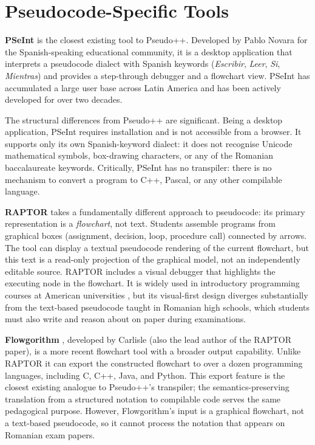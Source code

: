 \section{Pseudocode-Specific Tools}
\label{sec:pseudocode-tools}

\textbf{PSeInt} \cite{psint} is the closest existing tool to Pseudo++.
Developed by Pablo Novara for the Spanish-speaking educational community,
it is a desktop application that interprets a pseudocode dialect with
Spanish keywords (\textit{Escribir}, \textit{Leer}, \textit{Si},
\textit{Mientras}) and provides a step-through debugger and a flowchart
view.  PSeInt has accumulated a large user base across Latin America and
has been actively developed for over two decades.

The structural differences from Pseudo++ are significant.  Being a
desktop application, PSeInt requires installation and is not accessible
from a browser.  It supports only its own Spanish-keyword dialect: it
does not recognise Unicode mathematical symbols, box-drawing characters,
or any of the Romanian baccalaureate keywords.  Critically, PSeInt has
no transpiler: there is no mechanism to convert a program to C++, Pascal,
or any other compilable language.

\textbf{RAPTOR} \cite{raptor} takes a fundamentally different approach to
pseudocode: its primary representation is a \emph{flowchart}, not text.
Students assemble programs from graphical boxes (assignment, decision,
loop, procedure call) connected by arrows.  The tool can display a
textual pseudocode rendering of the current flowchart, but this text is
a read-only projection of the graphical model, not an independently
editable source.  RAPTOR includes a visual debugger that highlights the
executing node in the flowchart.  It is widely used in introductory
programming courses at American universities \cite{raptor}, but its
visual-first design diverges substantially from the text-based pseudocode
taught in Romanian high schools, which students must also write and reason
about on paper during examinations.

\textbf{Flowgorithm} \cite{flowgorithm}, developed by Carlisle (also the
lead author of the RAPTOR paper), is a more recent flowchart tool with
a broader output capability.  Unlike RAPTOR it can export the constructed
flowchart to over a dozen programming languages, including C, C++, Java,
and Python.  This export feature is the closest existing analogue to
Pseudo++'s transpiler; the semantics-preserving translation from a
structured notation to compilable code serves the same pedagogical
purpose.  However, Flowgorithm's input is a graphical flowchart, not a
text-based pseudocode, so it cannot process the notation that appears on
Romanian exam papers.

